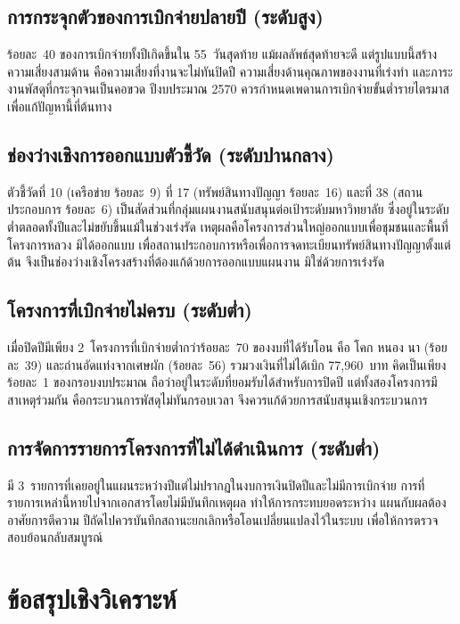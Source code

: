 \subsection{การกระจุกตัวของการเบิกจ่ายปลายปี (ระดับสูง)}
ร้อยละ~40 ของการเบิกจ่ายทั้งปีเกิดขึ้นใน 55~วันสุดท้าย แม้ผลลัพธ์สุดท้ายจะดี
แต่รูปแบบนี้สร้างความเสี่ยงสามด้าน คือความเสี่ยงที่งานจะไม่ทันปิดปี
ความเสี่ยงด้านคุณภาพของงานที่เร่งทำ และภาระงานพัสดุที่กระจุกจนเป็นคอขวด
ปีงบประมาณ 2570 ควรกำหนดเพดานการเบิกจ่ายขั้นต่ำรายไตรมาสเพื่อแก้ปัญหานี้ที่ต้นทาง

\subsection{ช่องว่างเชิงการออกแบบตัวชี้วัด (ระดับปานกลาง)}
ตัวชี้วัดที่ 10 (เครือข่าย ร้อยละ~9) ที่ 17 (ทรัพย์สินทางปัญญา ร้อยละ~16)
และที่ 38 (สถานประกอบการ ร้อยละ~6) เป็นสัดส่วนที่กลุ่มแผนงานสนับสนุนต่อเป้าระดับมหาวิทยาลัย
ซึ่งอยู่ในระดับต่ำตลอดทั้งปีและไม่ขยับขึ้นแม้ในช่วงเร่งรัด
เหตุผลคือโครงการส่วนใหญ่ออกแบบเพื่อชุมชนและพื้นที่โครงการหลวง มิได้ออกแบบ
เพื่อสถานประกอบการหรือเพื่อการจดทะเบียนทรัพย์สินทางปัญญาตั้งแต่ต้น
จึงเป็นช่องว่างเชิงโครงสร้างที่ต้องแก้ด้วยการออกแบบแผนงาน มิใช่ด้วยการเร่งรัด

\subsection{โครงการที่เบิกจ่ายไม่ครบ (ระดับต่ำ)}
เมื่อปิดปีมีเพียง 2~โครงการที่เบิกจ่ายต่ำกว่าร้อยละ~70 ของงบที่ได้รับโอน
คือ โคก หนอง นา (ร้อยละ~39) และถ่านอัดแท่งจากเศษผัก (ร้อยละ~56)
รวมวงเงินที่ไม่ได้เบิก 77,960~บาท คิดเป็นเพียงร้อยละ~1 ของกรอบงบประมาณ
ถือว่าอยู่ในระดับที่ยอมรับได้สำหรับการปิดปี แต่ทั้งสองโครงการมีสาเหตุร่วมกัน
คือกระบวนการพัสดุไม่ทันกรอบเวลา จึงควรแก้ด้วยการสนับสนุนเชิงกระบวนการ

\subsection{การจัดการรายการโครงการที่ไม่ได้ดำเนินการ (ระดับต่ำ)}
มี 3~รายการที่เคยอยู่ในแผนระหว่างปีแต่ไม่ปรากฏในงบการเงินปิดปีและไม่มีการเบิกจ่าย
การที่รายการเหล่านี้หายไปจากเอกสารโดยไม่มีบันทึกเหตุผล ทำให้การกระทบยอดระหว่าง
แผนกับผลต้องอาศัยการตีความ ปีถัดไปควรบันทึกสถานะยกเลิกหรือโอนเปลี่ยนแปลงไว้ในระบบ
เพื่อให้การตรวจสอบย้อนกลับสมบูรณ์

\section{ข้อสรุปเชิงวิเคราะห์}

